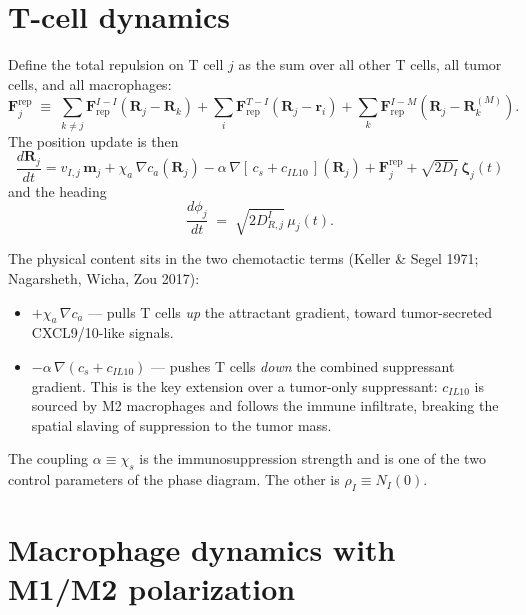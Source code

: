 \documentclass[11pt,letterpaper]{article}
\begin{document}
\section{T-cell dynamics}
\label{sec:tcell-dynamics}

Define the total repulsion on T cell $j$ as the sum over all other
T cells, all tumor cells, and all macrophages:
\begin{equation}
\mathbf{F}^{\text{rep}}_{j}
   \;\equiv\; \sum_{k\ne j} \mathbf{F}_{\text{rep}}^{I-I}(\mathbf{R}_j - \mathbf{R}_k)
            + \sum_{i}      \mathbf{F}_{\text{rep}}^{T-I}(\mathbf{R}_j - \mathbf{r}_i)
            + \sum_{k}      \mathbf{F}_{\text{rep}}^{I-M}(\mathbf{R}_j - \mathbf{R}_k^{(M)}).
\label{eq:tcell_Frep}
\end{equation}
The position update is then
\begin{equation}
\boxed{\;
\frac{d\mathbf{R}_j}{dt}
  = v_{I,j}\,\mathbf{m}_j
  + \chi_a\,\nabla c_a(\mathbf{R}_j)
  - \alpha\,\nabla\!\left[\,c_s + c_{IL10}\,\right]\!(\mathbf{R}_j)
  + \mathbf{F}^{\text{rep}}_{j}
  + \sqrt{2 D_I}\,\bm{\zeta}_j(t)
\;}
\label{eq:tcell_pos}
\end{equation}
and the heading
\begin{equation}
\frac{d\phi_j}{dt} \;=\; \sqrt{2 D_{R,j}^{I}}\,\mu_j(t).
\end{equation}

The physical content sits in the two chemotactic terms (Keller \&
Segel 1971; Nagarsheth, Wicha, Zou 2017):
\begin{itemize}[nosep]
  \item $+\chi_a\,\nabla c_a$ --- pulls T cells \emph{up} the
        attractant gradient, toward tumor-secreted CXCL9/10-like
        signals.
  \item $-\alpha\,\nabla(c_s + c_{IL10})$ --- pushes T cells \emph{down}
        the combined suppressant gradient. This is the key extension
        over a tumor-only suppressant: $c_{IL10}$ is sourced by M2
        macrophages and follows the immune infiltrate, breaking the
        spatial slaving of suppression to the tumor mass.
\end{itemize}
The coupling $\alpha \equiv \chi_s$ is the immunosuppression strength
and is one of the two control parameters of the phase diagram. The
other is $\rho_I \equiv N_I(0)$.

\section{Macrophage dynamics with M1/M2 polarization}
\label{sec:m1-macrophage}
\end{document}
